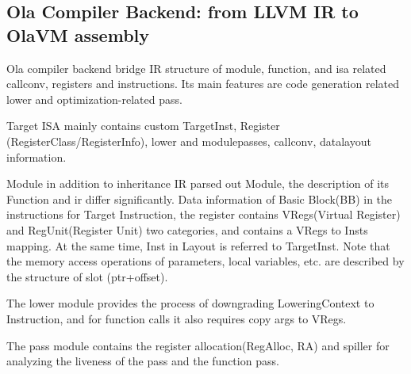 \subsection{Ola Compiler Backend: from LLVM IR to OlaVM assembly}

Ola compiler backend bridge IR structure of module, function, and isa related callconv, registers and instructions.
Its main features are code generation related lower and optimization-related pass.

Target ISA mainly contains custom TargetInst, Register (RegisterClass/RegisterInfo), lower and modulepasses, callconv, datalayout information.

Module in addition to inheritance IR parsed out Module, the description of its Function and ir differ significantly.
Data information of Basic Block(BB) in the instructions for Target Instruction, the register contains VRegs(Virtual Register) and RegUnit(Register Unit) two categories, and contains a VRegs to Insts mapping.
At the same time, Inst in Layout is referred to TargetInst. Note that the memory access operations of parameters, local variables, etc. are described by the structure of slot (ptr+offset).

The lower module provides the process of downgrading LoweringContext to Instruction, and for function calls it also requires copy args to VRegs.

The pass module contains the register allocation(RegAlloc, RA) and spiller for analyzing the liveness of the pass and the function pass.










